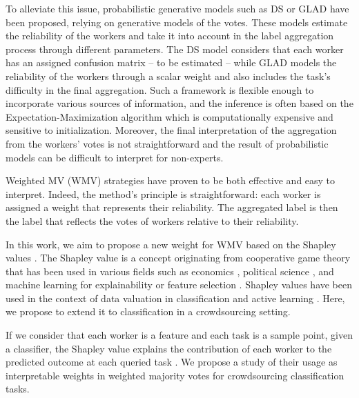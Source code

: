 \documentclass{cap2024}
\begin{document}
To alleviate this issue, probabilistic generative models such as DS \citep{dawid_maximum_1979} or GLAD \citep{whitehill_whose_2009} have been proposed, relying on generative models of the votes.
These models estimate the reliability of the workers and take it into account in the label aggregation process through different parameters. The DS model considers that each worker has an assigned confusion matrix -- to be estimated -- while GLAD models the reliability of the workers through a scalar weight and also includes the task's difficulty in the final aggregation.
Such a framework is flexible enough to incorporate various sources of information, and the inference is often based on the Expectation-Maximization algorithm which is computationally expensive and sensitive to initialization.
Moreover, the final interpretation of the aggregation from the workers' votes is not straightforward and the result of probabilistic models can be difficult to interpret for non-experts.

Weighted MV (WMV) strategies \citep{appen_wawa_2021,karger2011iterative,ma2020adversarial} have proven to be both effective and easy to interpret. Indeed, the method's principle is straightforward: each worker is assigned a weight that represents their reliability. The aggregated label is then the label that reflects the votes of workers relative to their reliability.

In this work, we aim to propose a new weight for WMV based on the Shapley values \citep{shapley1953value}.
The Shapley value is a concept originating from cooperative game theory that has been used in various fields such as economics \citep{aumann1994economic}, political science \citep{engelbrecht2009use}, and machine learning for explainability \citep{lundberg2017unified} or feature selection \citep{cohen2007feature}.
Shapley values have been used in the context of data valuation in classification \citep{schoch2022cs} and active learning \citep{ghorbani2022data}. Here, we propose to extend it to classification in a crowdsourcing setting.

If we consider that each worker is a feature and each task is a sample point, given a classifier, the Shapley value explains the contribution of each worker to the predicted outcome at each queried task \citep{molnar2020interpretable}.
We propose a study of their usage as interpretable weights in weighted majority votes for crowdsourcing classification tasks.
\end{document}
